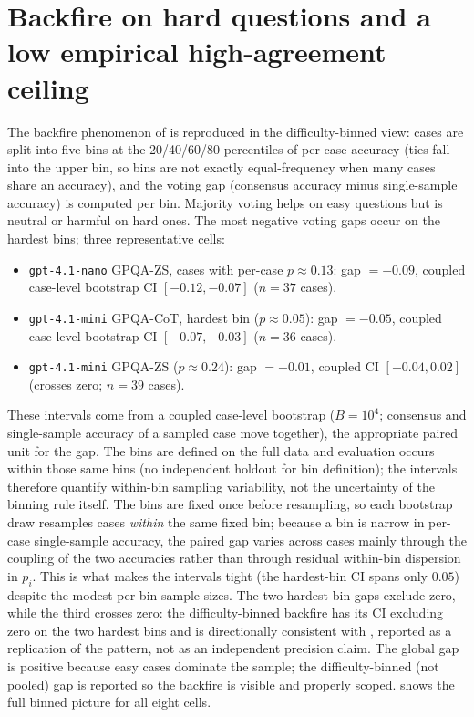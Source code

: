 \documentclass{article}
\begin{document}
\section{Backfire on hard questions and a low empirical high-agreement ceiling}
\label{app:backfire}

The backfire phenomenon of \cite{bahuguna2026when} is reproduced in the
difficulty-binned view: cases are split into five bins at the
20/40/60/80 percentiles of per-case accuracy (ties fall into the upper
bin, so bins are not exactly equal-frequency when many cases share an
accuracy), and the voting gap (consensus accuracy minus single-sample
accuracy) is computed per bin. Majority voting helps
on easy questions but is neutral or
harmful on hard ones. The most negative voting gaps occur on the hardest
bins; three representative cells:
\begin{itemize}
\item \texttt{gpt-4.1-nano} GPQA-ZS, cases with per-case $p\approx0.13$:
  gap $= -0.09$, coupled case-level bootstrap CI $[-0.12, -0.07]$ ($n=37$ cases).
\item \texttt{gpt-4.1-mini} GPQA-CoT, hardest bin ($p\approx0.05$):
  gap $= -0.05$, coupled case-level bootstrap CI $[-0.07, -0.03]$ ($n=36$ cases).
\item \texttt{gpt-4.1-mini} GPQA-ZS ($p\approx0.24$): gap $= -0.01$,
  coupled CI $[-0.04, 0.02]$ (crosses zero; $n=39$ cases).
\end{itemize}
These intervals come from a coupled case-level bootstrap ($B=10^4$; consensus and single-sample accuracy of a sampled case move together), the appropriate paired unit for the gap. The bins are defined on the full data and evaluation occurs within those same bins (no independent holdout for bin definition); the intervals therefore quantify within-bin sampling variability, not the uncertainty of the binning rule itself. The bins are fixed once before resampling, so each bootstrap draw resamples cases \emph{within} the same fixed bin; because a bin is narrow in per-case single-sample accuracy, the paired gap varies across cases mainly through the coupling of the two accuracies rather than through residual within-bin dispersion in $p_i$. This is what makes the intervals tight (the hardest-bin CI spans only $0.05$) despite the modest per-bin sample sizes. The two hardest-bin gaps exclude zero, while the third crosses
zero: the difficulty-binned backfire has its CI excluding zero on the
two hardest bins and is directionally consistent with
\cite{bahuguna2026when}, reported as a replication of the pattern,
not as an
independent precision claim.
The global gap is positive because easy cases dominate the sample; the difficulty-binned (not pooled) gap is reported so the backfire is visible
and properly scoped.  shows the full binned picture
for all eight cells.
\end{document}
